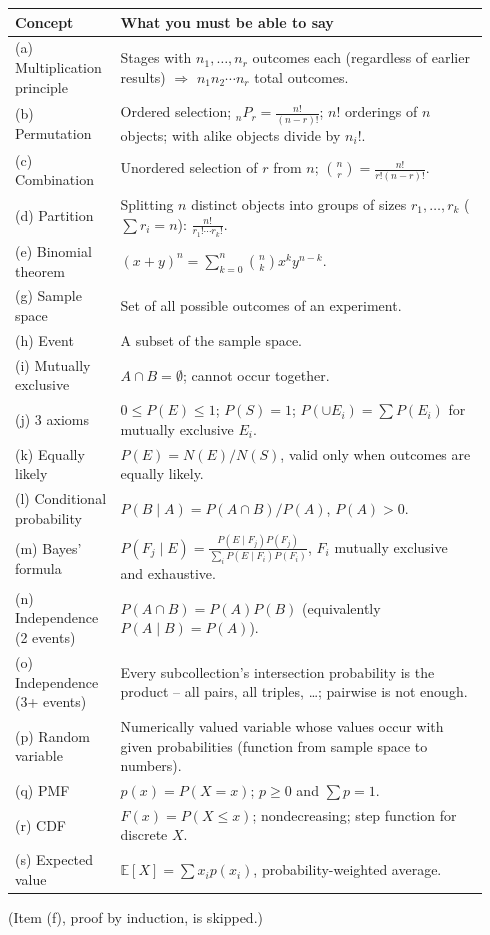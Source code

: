 \documentclass[11pt]{article}
\newcommand{\E}{\mathbb{E}}
\newcommand{\nCr}[2]{\binom{#1}{#2}}
\newcommand{\nPr}[2]{{}_{#1}P_{#2}}
\begin{document}
\begin{center}
\renewcommand{\arraystretch}{1.35}
\begin{tabular}{@{}>{\raggedright\arraybackslash}p{0.2\linewidth}p{0.74\linewidth}@{}}
\toprule
\textbf{Concept} & \textbf{What you must be able to say}\\\midrule
(a) Multiplication principle & Stages with $n_1,\dots,n_r$ outcomes each (regardless of earlier results) $\Rightarrow$ $n_1n_2\cdots n_r$ total outcomes.\\
(b) Permutation & Ordered selection; $\nPr nr=\frac{n!}{(n-r)!}$; $n!$ orderings of $n$ objects; with alike objects divide by $n_i!$.\\
(c) Combination & Unordered selection of $r$ from $n$; $\nCr nr=\frac{n!}{r!(n-r)!}$.\\
(d) Partition & Splitting $n$ distinct objects into groups of sizes $r_1,\dots,r_k$ ($\sum r_i=n$): $\frac{n!}{r_1!\cdots r_k!}$.\\
(e) Binomial theorem & $(x+y)^n=\sum_{k=0}^n\nCr nk x^ky^{n-k}$.\\
(g) Sample space & Set of all possible outcomes of an experiment.\\
(h) Event & A subset of the sample space.\\
(i) Mutually exclusive & $A\cap B=\emptyset$; cannot occur together.\\
(j) 3 axioms & $0\le P(E)\le1$; $P(S)=1$; $P(\cup E_i)=\sum P(E_i)$ for mutually exclusive $E_i$.\\
(k) Equally likely & $P(E)=N(E)/N(S)$, valid only when outcomes are equally likely.\\
(l) Conditional probability & $P(B\mid A)=P(A\cap B)/P(A)$, $P(A)>0$.\\
(m) Bayes' formula & $P(F_j\mid E)=\frac{P(E\mid F_j)P(F_j)}{\sum_iP(E\mid F_i)P(F_i)}$, $F_i$ mutually exclusive and exhaustive.\\
(n) Independence (2 events) & $P(A\cap B)=P(A)P(B)$ (equivalently $P(A\mid B)=P(A)$).\\
(o) Independence (3+ events) & Every subcollection's intersection probability is the product -- all pairs, all triples, \dots; pairwise is not enough.\\
(p) Random variable & Numerically valued variable whose values occur with given probabilities (function from sample space to numbers).\\
(q) PMF & $p(x)=P(X=x)$; $p\ge0$ and $\sum p=1$.\\
(r) CDF & $F(x)=P(X\le x)$; nondecreasing; step function for discrete $X$.\\
(s) Expected value & $\E[X]=\sum x_ip(x_i)$, probability-weighted average.\\\bottomrule
\end{tabular}
\end{center}
(Item (f), proof by induction, is skipped.)
\end{document}
